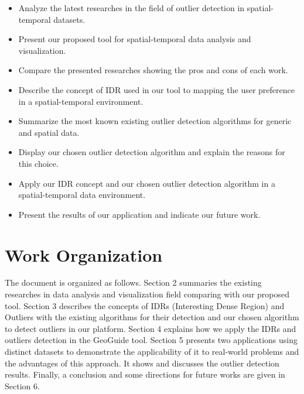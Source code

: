 \begin{itemize}
	\item
	      Analyze the latest researches in the field of outlier detection in spatial-temporal
	      datasets.
	\item
	      Present our proposed tool for spatial-temporal data analysis and visualization.
	\item
	      Compare the presented researches showing the pros and cons of each work.
	\item
	      Describe the concept of IDR used in our tool to mapping the user preference in a
	      spatial-temporal environment.
	\item
	      Summarize the most known existing outlier detection algorithms for generic and spatial
	      data.
	\item
	      Display our chosen outlier detection algorithm and explain the reasons for this choice.
	\item
	      Apply our IDR concept and our chosen outlier detection algorithm in a spatial-temporal
	      data environment.
	\item
	      Present the results of our application and indicate our future work.

\end{itemize}

\section{Work Organization}

The document is organized as follows. Section 2 summaries the existing researches
in data analysis and visualization field comparing with our proposed tool. Section 3 describes
the concepts of IDRs (Interesting Dense Region) and Outliers with the existing algorithms for
their detection and our chosen algorithm to detect outliers in our platform. Section 4 explains
how we apply the IDRs and outliers detection in the GeoGuide tool. Section 5 presents two
applications using distinct datasets to demonstrate the applicability of it to real-world
problems and the advantages of this approach. It shows and discusses the outlier detection
results. Finally, a conclusion and some directions for future works are given in Section 6.
